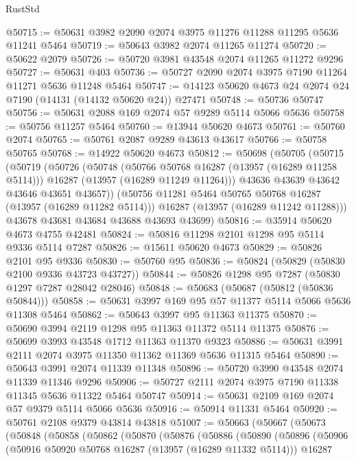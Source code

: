 \begin{lexlean}{RustStd}
\begin{coremodule}
@50715 := @50631 @3982 @2090 @2074 @3975 @11276 @11288 @11295 @5636 @11241 @5464
@50719 := @50643 @3982 @2074 @11265 @11274
@50720 := @50622 @2079
@50726 := @50720 @3981 @43548 @2074 @11265 @11272 @9296
@50727 := @50631 @403
@50736 := @50727 @2090 @2074 @3975 @7190 @11264 @11271 @5636 @11248 @5464
@50747 := @14123 @50620 @4673 @24 @2074 @24 @7190 (@14131 (@14132 @50620 @24)) @27471
@50748 := @50736 @50747
@50756 := @50631 @2088 @169 @2074 @57 @9289 @5114 @5066 @5636
@50758 := @50756 @11257 @5464
@50760 := @13944 @50620 @4673
@50761 := @50760 @2074
@50765 := @50761 @2087 @9289 @43613 @43617
@50766 := @50758 @50765
@50768 := @14922 @50620 @4673
@50812 := @50698
    (@50705
      (@50715
        (@50719
          (@50726
            (@50748
              (@50766 @50768 @16287 (@13957 (@16289 @11258 @5114)))
              @16287
              (@13957 (@16289 @11249 @11264)))
            @43636
            @43639
            @43642
            @43646
            @43651
            @43657))
        (@50756 @11281 @5464 @50765 @50768 @16287 (@13957 (@16289 @11282 @5114)))
        @16287
        (@13957 (@16289 @11242 @11288)))
      @43678
      @43681
      @43684
      @43688
      @43693
      @43699)
@50816 := @35914 @50620 @4673 @4755 @42481
@50824 := @50816 @11298 @2101 @1298 @95 @5114 @9336 @5114 @7287
@50826 := @15611 @50620 @4673
@50829 := @50826 @2101 @95 @9336
@50830 := @50760 @95
@50836 := @50824 (@50829 (@50830 @2100 @9336 @43723 @43727))
@50844 := @50826 @1298 @95 @7287 (@50830 @1297 @7287 @28042 @28046)
@50848 := @50683 (@50687 (@50812 (@50836 @50844)))
@50858 := @50631 @3997 @169 @95 @57 @11377 @5114 @5066 @5636 @11308 @5464
@50862 := @50643 @3997 @95 @11363 @11375
@50870 := @50690 @3994 @2119 @1298 @95 @11363 @11372 @5114 @11375
@50876 := @50699 @3993 @43548 @1712 @11363 @11370 @9323
@50886 := @50631 @3991 @2111 @2074 @3975 @11350 @11362 @11369 @5636 @11315 @5464
@50890 := @50643 @3991 @2074 @11339 @11348
@50896 := @50720 @3990 @43548 @2074 @11339 @11346 @9296
@50906 := @50727 @2111 @2074 @3975 @7190 @11338 @11345 @5636 @11322 @5464 @50747
@50914 := @50631 @2109 @169 @2074 @57 @9379 @5114 @5066 @5636
@50916 := @50914 @11331 @5464
@50920 := @50761 @2108 @9379 @43814 @43818
@51007 := @50663
    (@50667
      (@50673
        (@50848
          (@50858
            (@50862
              (@50870
                (@50876
                  (@50886
                    (@50890
                      (@50896
                        (@50906
                          (@50916 @50920 @50768 @16287 (@13957 (@16289 @11332 @5114)))
                          @16287

\end{coremodule}
\end{lexlean}
